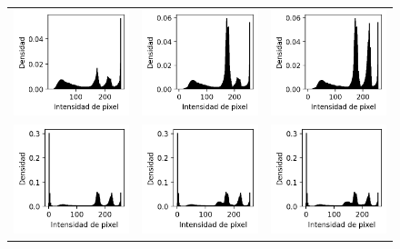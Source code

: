 \begin{figure}[!b]
    \centering
    \begin{tabular}{ccc}
        \includegraphics[width=4cm]{../Plots/THR/threshold_input_0.png} &
        \includegraphics[width=4cm]{../Plots/THR/threshold_input_1.png} &
        \includegraphics[width=4cm]{../Plots/THR/threshold_input_2.png} \\

        \includegraphics[width=4cm]{../Plots/THR/threshold_input_3.png} &
        \includegraphics[width=4cm]{../Plots/THR/threshold_input_4.png} &
        \includegraphics[width=4cm]{../Plots/THR/threshold_input_5.png} \\


\end{tabular}
\end{figure}
